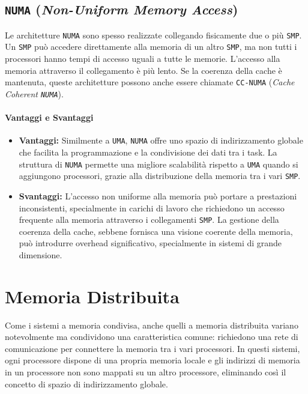 \subsection{\texttt{NUMA} (\textit{Non-Uniform Memory Access})}
Le architetture \texttt{NUMA} sono spesso realizzate collegando fisicamente due
o più \texttt{SMP}. Un \texttt{SMP} può accedere direttamente alla memoria di un altro \texttt{SMP},
ma non tutti i processori hanno tempi di accesso uguali a tutte le memorie.
L'accesso alla memoria attraverso il collegamento è più lento. Se la coerenza
della cache è mantenuta, queste architetture possono anche essere chiamate
\texttt{CC-NUMA}
(\textit{Cache Coherent \texttt{NUMA}}).

\paragraph{Vantaggi e Svantaggi}
\begin{itemize}
    \item \textbf{Vantaggi:} Similmente a \texttt{UMA}, \texttt{NUMA} offre
    uno spazio di indirizzamento globale che facilita la programmazione e la
    condivisione dei dati tra i task. La struttura di \texttt{NUMA} permette
    una migliore scalabilità rispetto a \texttt{UMA} quando si aggiungono
    processori, grazie alla distribuzione della memoria tra i vari \texttt{SMP}.
    \item \textbf{Svantaggi:} L'accesso non uniforme alla memoria può portare
    a prestazioni inconsistenti, specialmente in carichi di lavoro che richiedono
    un accesso frequente alla memoria attraverso i collegamenti \texttt{SMP}. La gestione
    della coerenza della cache, sebbene fornisca una visione coerente della memoria,
    può introdurre overhead significativo, specialmente in sistemi di grande
    dimensione.
\end{itemize}

\section{Memoria Distribuita}
Come i sistemi a memoria condivisa, anche quelli a memoria distribuita
variano notevolmente ma condividono una caratteristica comune: richiedono
una rete di comunicazione per connettere la memoria tra i vari processori.
In questi sistemi, ogni processore dispone di una propria memoria locale e
gli indirizzi di memoria in un processore non sono mappati su un altro processore,
eliminando così il concetto di spazio di indirizzamento globale.

